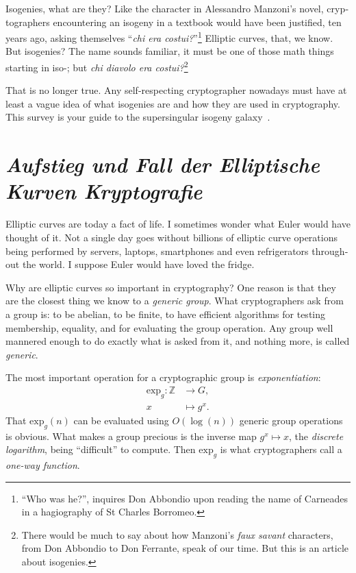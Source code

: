 \begin{otherlanguage}{english}
  \def\Z{\mathbb{Z}}
  \def\F{\mathbb{F}}
  \def\exp{\mathrm{exp}}
  \def\com{\mathcal{C}}
  \def\Gal{\mathrm{Gal}}
  \def\End{\mathrm{End}}
  \def\O{\mathcal{O}}
  
  Isogenies, what are they? Like the character in Alessandro Manzoni's
  novel, cryptographers encountering an isogeny in a textbook would
  have been justified, ten years ago, asking themselves ``\textit{chi
    era costui?}''\footnote{``Who was he?'', inquires Don Abbondio
    upon reading the name of Carneades in a hagiography of St Charles
    Borromeo.} Elliptic curves, that, we know. But isogenies?  The
  name sounds familiar, it must be one of those math things starting
  in iso-; but \textit{chi diavolo era costui?}\footnote{There would
    be much to say about how Manzoni's \textit{faux savant}
    characters, from Don Abbondio to Don Ferrante, speak of our
    time. But this is an article about isogenies.}

  That is no longer true. Any self-respecting cryptographer nowadays
  must have at least a vague idea of what isogenies are and how they
  are used in cryptography. This survey is your guide to the
  supersingular isogeny galaxy~\cite{galaxy}.

  \section{\textit{Aufstieg und Fall der Elliptische Kurven Kryptografie}}
  Elliptic curves are today a fact of life.  I sometimes wonder what
  Euler would have thought of it.  Not a single day goes without
  billions of elliptic curve operations being performed by servers,
  laptops, smartphones and even refrigerators throughout the world. I
  suppose Euler would have loved the fridge.

  Why are elliptic curves so important in cryptography? One reason is
  that they are the closest thing we know to a \emph{generic
    group}. What cryptographers ask from a group is: to be abelian, to
  be finite, to have efficient algorithms for testing membership,
  equality, and for evaluating the group operation. Any group well
  mannered enough to do exactly what is asked from it, and nothing
  more, is called \emph{generic}.

  The most important operation for a cryptographic group is
  \emph{exponentiation}:
  \begin{align*}
    \exp_g : \Z &\to G,\\
    x &\mapsto g^x.
  \end{align*}
  That $\exp_g(n)$ can be evaluated using $O(\log(n))$ generic group
  operations is obvious. What makes a group precious is the inverse
  map $g^x\mapsto x$, the \emph{discrete logarithm}, being
  ``difficult'' to compute. Then $\exp_g$ is what cryptographers call
  a \emph{one-way function}.


\end{otherlanguage}
